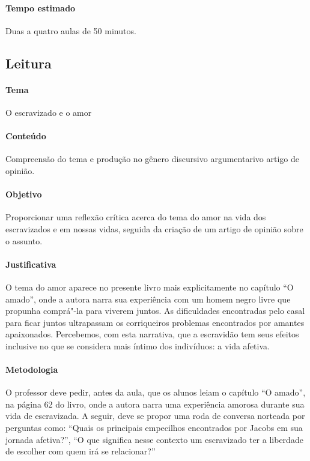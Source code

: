 \documentclass[11pt]{extarticle}
\begin{document}
 \paragraph{Tempo estimado} Duas a quatro aulas de 50 minutos.


\subsection{Leitura}

 \paragraph{Tema} O escravizado e o amor

 \paragraph{Conteúdo} Compreensão do tema e produção no gênero discursivo 
 argumentarivo artigo de opinião.

 \paragraph{Objetivo} Proporcionar uma reflexão crítica acerca do tema do amor
 na vida dos escravizados e em nossas vidas, seguida da criação de um artigo de opinião
 sobre o assunto.

 \paragraph{Justificativa} O tema do amor aparece no presente livro mais explicitamente
 no capítulo ``O amado'', onde a autora narra sua experiência com um 
 homem negro livre que propunha comprá"-la para viverem juntos. As dificuldades 
 encontradas pelo casal para ficar juntos ultrapassam os corriqueiros problemas
 encontrados por amantes apaixonados. Percebemos, com esta narrativa, que a escravidão
 tem seus efeitos inclusive no que se considera mais íntimo dos indivíduos: a vida
 afetiva.

 \paragraph{Metodologia}
    O professor deve pedir, antes da aula, que os alunos leiam o capítulo ``O amado'', 
    na página 62 do livro, onde a autora narra uma experiência amorosa durante 
    sua vida de escravizada.
    A seguir, deve se propor uma roda de conversa norteada por perguntas como:
    ``Quais os principais empecilhos encontrados por Jacobs em sua jornada afetiva?'',
    ``O que significa nesse contexto um escravizado ter a liberdade de escolher
    com quem irá se relacionar?''
\end{document}
